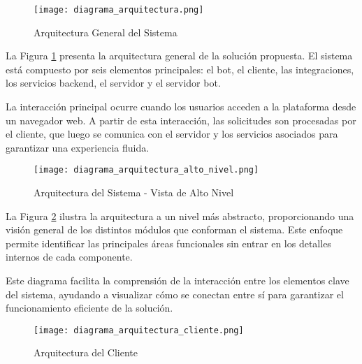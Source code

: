 
\begin{figure}[htbp]
    \centering
    \texttt{[image: diagrama\_arquitectura.png]}
    \caption{Arquitectura General del Sistema}
    \label{fig:diagrama_arquitectura}
\end{figure}

La Figura \ref{fig:diagrama_arquitectura} presenta la arquitectura general de la
solución propuesta. El sistema está compuesto por seis elementos principales: el
bot, el cliente, las integraciones, los servicios backend, el servidor y el
servidor bot. 

La interacción principal ocurre cuando los usuarios acceden a la plataforma
desde un navegador web. A partir de esta interacción, las solicitudes son
procesadas por el cliente, que luego se comunica con el servidor y los servicios
asociados para garantizar una experiencia fluida.

\begin{figure}[htbp]
    \centering
    \texttt{[image: diagrama\_arquitectura\_alto\_nivel.png]}
    \caption{Arquitectura del Sistema - Vista de Alto Nivel}
    \label{fig:diagrama_arquitectura_alto_nivel}
\end{figure}

La Figura \ref{fig:diagrama_arquitectura_alto_nivel} ilustra la arquitectura a
un nivel más abstracto, proporcionando una visión general de los distintos
módulos que conforman el sistema. Este enfoque permite identificar las
principales áreas funcionales sin entrar en los detalles internos de cada
componente. 

Este diagrama facilita la comprensión de la interacción entre los elementos
clave del sistema, ayudando a visualizar cómo se conectan entre sí para
garantizar el funcionamiento eficiente de la solución.

\begin{figure}[htbp]
    \centering
    \texttt{[image: diagrama\_arquitectura\_cliente.png]}
    \caption{Arquitectura del Cliente}
    \label{fig:diagrama_arquitectura_cliente}
\end{figure}

